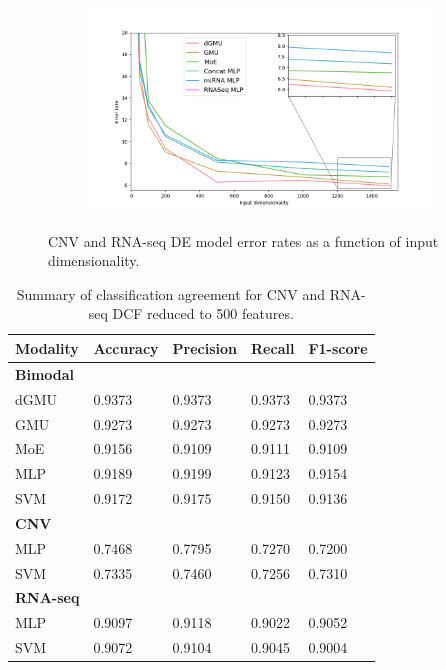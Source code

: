 \begin{figure}[H]
     \centering
     \begin{subfigure}[b]{\textwidth}
         \centering
         \includegraphics[width=\textwidth]{img/c_r/exp82.png}
     \end{subfigure}
        \caption{CNV and RNA-seq DE model error rates as a function of input dimensionality.}
        \label{fig:c_r_dcf_exp82}
\end{figure}

\begin{table}[H]
   \caption{Summary of classification agreement for CNV and RNA-seq DCF reduced to 500 features.} 
   \small %
   \centering %
   \begin{tabular}{lllll} %
   \toprule[\heavyrulewidth]\toprule[\heavyrulewidth]
   \textbf{Modality} & \textbf{Accuracy} & \textbf{Precision} & \textbf{Recall} & \textbf{F1-score} \\ 
   \midrule
   \multicolumn{1}{l}{\textbf{Bimodal}} \\
        dGMU & 0.9373 &	0.9373 & 0.9373 & 0.9373\\
        GMU  & 0.9273 &	0.9273 & 0.9273 & 0.9273\\
        MoE  & 0.9156 &	0.9109 & 0.9111 & 0.9109\\
        MLP  & 0.9189 &	0.9199 & 0.9123 & 0.9154\\
        SVM  & 0.9172 &	0.9175 & 0.9150 & 0.9136\\
   \midrule
   \multicolumn{1}{l}{\textbf{CNV}} \\
        MLP  & 0.7468 &	0.7795 & 0.7270 & 0.7200\\
        SVM  & 0.7335 &	0.7460 & 0.7256 & 0.7310\\
   \midrule
   \multicolumn{1}{l}{\textbf{RNA-seq}}  \\
        MLP  & 0.9097 &	0.9118 & 0.9022 & 0.9052\\
        SVM  & 0.9072 &	0.9104 & 0.9045 & 0.9004\\
   \bottomrule[\heavyrulewidth] 
   \end{tabular}
   \label{table:c_r_dcf_exp41}
\end{table}

